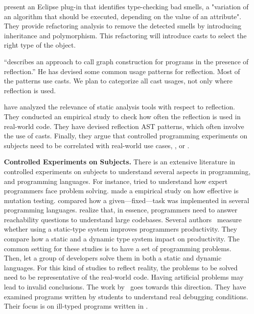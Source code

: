 \cite{tsantalisJDeodorantIdentificationRemoval2008} present an
Eclipse plug-in that identifies type-checking bad smells,
a "variation of an algorithm that should be executed,
depending on the value of an attribute".
They provide refactoring analysis to remove the detected smells
by introducing inheritance and polymorphism.
This refactoring will introduce casts to select
the right type of the object.

\cite{livshitsImprovingSoftwareSecurity2006,livshitsReflectionAnalysisJava2005} ``describes an approach to call graph construction for \java{} programs in the presence of reflection.''
He has devised some common usage patterns for reflection.
Most of the patterns use casts.
We plan to categorize all cast usages,
not only where reflection is used.

\cite{landmanChallengesStaticAnalysis2017} have analyzed the relevance of
static analysis tools with respect to reflection.
They conducted an empirical study to check how often the reflection
\api{} is used in real-world code.
They have devised reflection AST patterns,
which often involve the use of casts.
Finally, they argue that controlled programming experiments on
subjects need to be correlated with real-world use cases,
\eg, \github{} or \mavencentral{}.

\textbf{Controlled Experiments on Subjects.}
There is an extensive literature \perse{} in controlled experiments on subjects to understand several aspects in programming, and programming languages.
For instance, \cite{solowayEmpiricalStudiesProgramming1984} tried to understand how expert programmers face problem solving.
\cite{buddTheoreticalEmpiricalStudies1980} made a empirical study on how effective is mutation testing.
\cite{precheltEmpiricalComparisonSeven2000} compared how a given---fixed---task was implemented in several programming languages.
\cite{latozaDevelopersAskReachability2010} realize that, in essence, programmers need to answer reachability questions to understand large codebases.
Several authors~\cite{stuchlikStaticVsDynamic2011,mayerEmpiricalStudyInfluence2012,harlinImpactUsingStaticType2017} measure whether using a static-type system improves programmers productivity.
They compare how a static and a dynamic type system impact on productivity.
The common setting for these studies is to have a set of programming problems.
Then, let a group of developers solve them in both a static and dynamic languages.
For this kind of studies to reflect reality, the problems to be solved need to be representative of the real-world code.
Having artificial problems may lead to invalid conclusions.
The work by~\cite{wuHowTypeErrors2017,wuLearningUserFriendly2017} goes towards this direction. 
They have examined programs written by students to understand real debugging conditions. 
Their focus is on ill-typed programs written in \haskell{}.
